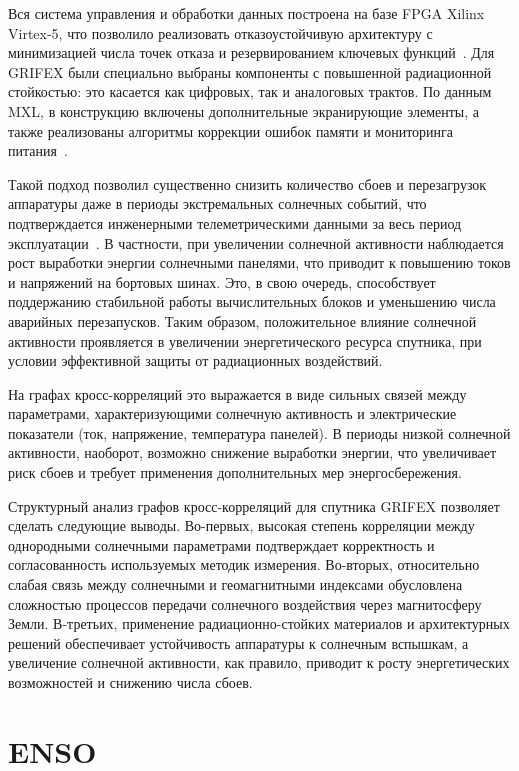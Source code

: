 Вся система управления и обработки данных построена на базе FPGA Xilinx
Virtex-5, что позволило реализовать отказоустойчивую архитектуру с минимизацией
числа точек отказа и резервированием ключевых функций~\cite{eoportal_grifex}.
Для GRIFEX были специально выбраны компоненты с повышенной радиационной
стойкостью: это касается как цифровых, так и аналоговых трактов. По данным MXL,
в конструкцию включены дополнительные экранирующие элементы, а также реализованы
алгоритмы коррекции ошибок памяти и мониторинга питания~\cite{mxl_grifex}.

Такой подход позволил существенно снизить количество сбоев и перезагрузок
аппаратуры даже в периоды экстремальных солнечных событий, что подтверждается
инженерными телеметрическими данными за весь период
эксплуатации~\cite{mxl_grifex}. В частности, при увеличении солнечной активности
наблюдается рост выработки энергии солнечными панелями, что приводит к повышению
токов и напряжений на бортовых шинах. Это, в свою очередь, способствует
поддержанию стабильной работы вычислительных блоков и уменьшению числа аварийных
перезапусков. Таким образом, положительное влияние солнечной активности
проявляется в увеличении энергетического ресурса спутника, при условии
эффективной защиты от радиационных воздействий.

На графах кросс-корреляций это выражается в виде сильных связей между
параметрами, характеризующими солнечную активность и электрические показатели
(ток, напряжение, температура панелей). В периоды низкой солнечной активности,
наоборот, возможно снижение выработки энергии, что увеличивает риск сбоев и
требует применения дополнительных мер энергосбережения.

Структурный анализ графов кросс-корреляций для спутника GRIFEX позволяет сделать
следующие выводы. Во-первых, высокая степень корреляции между однородными
солнечными параметрами подтверждает корректность и согласованность используемых
методик измерения. Во-вторых, относительно слабая связь между солнечными и
геомагнитными индексами обусловлена сложностью процессов передачи солнечного
воздействия через магнитосферу Земли. В-третьих, применение радиационно-стойких
материалов и архитектурных решений обеспечивает устойчивость аппаратуры к
солнечным вспышкам, а увеличение солнечной активности, как правило, приводит к
росту энергетических возможностей и снижению числа сбоев.

\section{ENSO}

